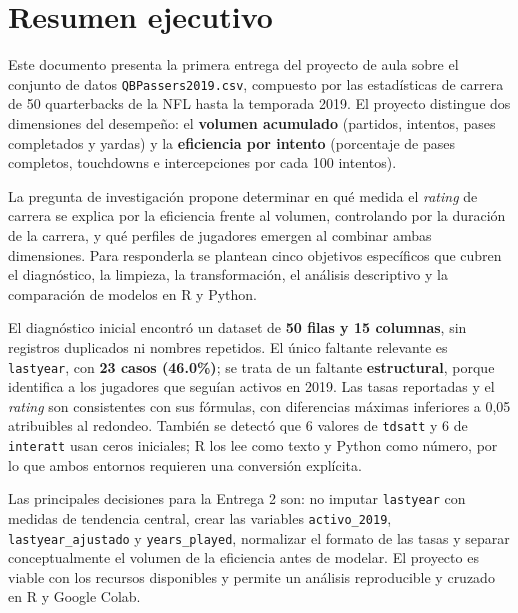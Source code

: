 \documentclass[11pt,a4paper]{article}
\begin{document}
\tableofcontents
\newpage

\section*{Resumen ejecutivo}

Este documento presenta la primera entrega del proyecto de aula sobre el conjunto de datos \texttt{QBPassers2019.csv}, compuesto por las estadísticas de carrera de 50 quarterbacks de la NFL hasta la temporada 2019. El proyecto distingue dos dimensiones del desempeño: el \textbf{volumen acumulado} (partidos, intentos, pases completados y yardas) y la \textbf{eficiencia por intento} (porcentaje de pases completos, touchdowns e intercepciones por cada 100 intentos).

La pregunta de investigación propone determinar en qué medida el \textit{rating} de carrera se explica por la eficiencia frente al volumen, controlando por la duración de la carrera, y qué perfiles de jugadores emergen al combinar ambas dimensiones. Para responderla se plantean cinco objetivos específicos que cubren el diagnóstico, la limpieza, la transformación, el análisis descriptivo y la comparación de modelos en R y Python.

El diagnóstico inicial encontró un dataset de \textbf{50 filas y 15 columnas}, sin registros duplicados ni nombres repetidos. El único faltante relevante es \texttt{lastyear}, con \textbf{23 casos (46.0\%)}; se trata de un faltante \textbf{estructural}, porque identifica a los jugadores que seguían activos en 2019. Las tasas reportadas y el \textit{rating} son consistentes con sus fórmulas, con diferencias máximas inferiores a 0,05 atribuibles al redondeo. También se detectó que 6 valores de \texttt{tdsatt} y 6 de \texttt{interatt} usan ceros iniciales; R los lee como texto y Python como número, por lo que ambos entornos requieren una conversión explícita.

Las principales decisiones para la Entrega 2 son: no imputar \texttt{lastyear} con medidas de tendencia central, crear las variables \texttt{activo\_2019}, \texttt{lastyear\_ajustado} y \texttt{years\_played}, normalizar el formato de las tasas y separar conceptualmente el volumen de la eficiencia antes de modelar. El proyecto es viable con los recursos disponibles y permite un análisis reproducible y cruzado en R y Google Colab.
\end{document}
